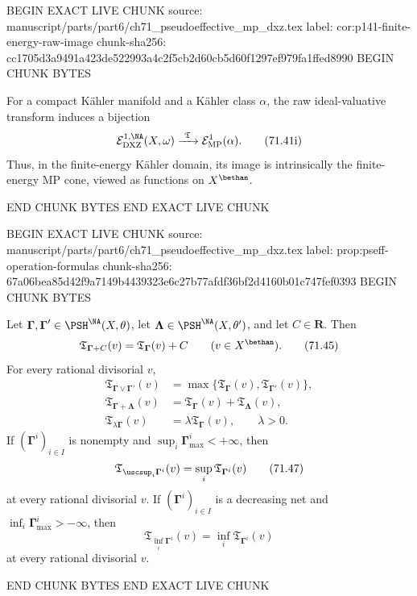 BEGIN EXACT LIVE CHUNK
source: manuscript/parts/part6/ch71_pseudoeffective_mp_dxz.tex
label: cor:p141-finite-energy-raw-image
chunk-sha256: cc1705d3a9491a423de522993a4c2f5cb2d60cb5d60f1297ef979fa1ffed8990
BEGIN CHUNK BYTES
\begin{corollary}\label{cor:p141-finite-energy-raw-image}
For a compact K\"ahler manifold and a K\"ahler class \(\alpha\), the
raw ideal-valuative transform induces a bijection
\[
 \mathcal E^{1,\NA}_{\mathrm{DXZ}}(X,\omega)
 \xrightarrow{\ \mathfrak T\ }
 \mathcal E^1_{\mathrm{MP}}(\alpha).
\tag{71.41i}\label{eq:p141-finite-energy-raw-image}
\]
Thus, in the finite-energy K\"ahler domain, its image is intrinsically
the finite-energy MP cone, viewed as functions on \(X^{\bethan}\).
\end{corollary}
END CHUNK BYTES
END EXACT LIVE CHUNK

BEGIN EXACT LIVE CHUNK
source: manuscript/parts/part6/ch71_pseudoeffective_mp_dxz.tex
label: prop:pseff-operation-formulas
chunk-sha256: 67a06bea85d42f9a7149b4439323e6c27b77afdf36bf2d4160b01c747fef0393
BEGIN CHUNK BYTES
\begin{proposition}\label{prop:pseff-operation-formulas}
Let \(\boldsymbol\Gamma,\boldsymbol\Gamma'\in
\PSH^{\NA}(X,\theta)\), let
\(\boldsymbol\Lambda\in\PSH^{\NA}(X,\theta')\), and let \(C\in\mathbf R\).
Then
\[
 \mathfrak T_{\boldsymbol\Gamma+C}(v)
 =\mathfrak T_{\boldsymbol\Gamma}(v)+C
 \qquad(v\in X^{\bethan}).
\tag{71.45}\label{eq:pseff-operation-translation}
\]
For every rational divisorial \(v\),
\[
 \begin{aligned}
 \mathfrak T_{\boldsymbol\Gamma\vee\boldsymbol\Gamma'}(v)
   &=\max\{\mathfrak T_{\boldsymbol\Gamma}(v),
            \mathfrak T_{\boldsymbol\Gamma'}(v)\},\\
 \mathfrak T_{\boldsymbol\Gamma+\boldsymbol\Lambda}(v)
   &=\mathfrak T_{\boldsymbol\Gamma}(v)
     +\mathfrak T_{\boldsymbol\Lambda}(v),\\
 \mathfrak T_{\lambda\boldsymbol\Gamma}(v)
   &=\lambda\mathfrak T_{\boldsymbol\Gamma}(v),
 \qquad \lambda>0.
 \end{aligned}
\tag{71.46}\label{eq:pseff-operation-algebra}
\]
If \((\boldsymbol\Gamma^i)_{i\in I}\) is nonempty and
\(\sup_i\boldsymbol\Gamma^i_{\max}<+\infty\), then
\[
 \mathfrak T_{\uscsup_i\boldsymbol\Gamma^i}(v)
 =\sup_i\mathfrak T_{\boldsymbol\Gamma^i}(v)
\tag{71.47}\label{eq:pseff-operation-supremum}
\]
at every rational divisorial \(v\).  If
\((\boldsymbol\Gamma^i)_{i\in I}\) is a decreasing net and
\(\inf_i\boldsymbol\Gamma^i_{\max}>-\infty\), then
\[
 \mathfrak T_{\inf_i\boldsymbol\Gamma^i}(v)
 =\inf_i\mathfrak T_{\boldsymbol\Gamma^i}(v)
\tag{71.48}\label{eq:pseff-operation-infimum}
\]
at every rational divisorial \(v\).
\end{proposition}
END CHUNK BYTES
END EXACT LIVE CHUNK
